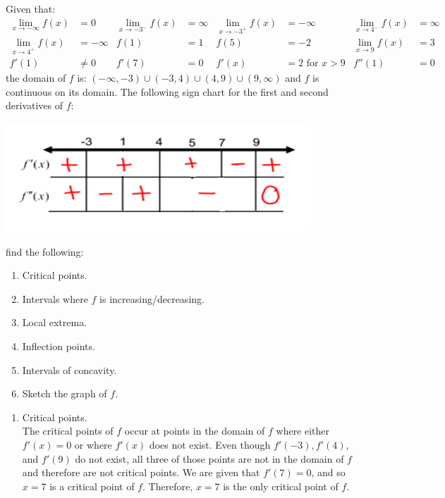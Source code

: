 \documentclass[nooutcomes,handout]{ximera}
\begin{document}
\begin{problem}
  Given that:
  \begin{align*}
    \lim_{x \to - \infty} f(x) &= 0 & \lim_{x \to -3^-} f(x) &= \infty  & \lim_{x \to -3^+} f(x) &= - \infty & \lim_{x \to 4^-} f(x) &= \infty\\
  \lim_{x \to 4^+} f(x) &= -\infty & f(1) &= 1 & f(5) &= -2 & \lim_{x \to 9} f(x) &= 3& \\
    f'(1) &\ne 0 & f'(7) &= 0 & f'(x) &= 2 \text{ for } x > 9 & f''(1) &= 0 &
 \end{align*}
     the domain of $f$ is: $(-\infty,-3) \cup (-3,4) \cup (4,9)\cup (9,\infty)$ and $f$ is continuous on its domain.
The following sign chart for the first and second derivatives of $f$:
  \begin{image}
    \includegraphics[scale=.8]{Figure8.png}
  \end{image}
	
find the following:
  \begin{enumerate}
     \item  Critical points.
     \item  Intervals where $f$ is increasing/decreasing.
     \item  Local extrema.
     \item  Inflection points.
     \item  Intervals of concavity.
     \item  Sketch the graph of $f$.
	
  \end{enumerate}
  \begin{freeResponse}
    \begin{enumerate}
      \item
        Critical points. \\
	The critical points of $f$ occur at points in the domain of $f$ where either $f'(x)=0$ or where $f'(x)$ does not exist.  Even though $f'(-3), f'(4),$ and $f'(9)$ do not exist, all three of those points are not in the domain of $f$ and therefore are not critical points.  
        We are given that $f'(7)=0$, and so $x=7$ is a critical point of $f$.
                Therefore, $x=7$ is the only critical point of $f$.  
			

\end{enumerate}
\end{freeResponse}
\end{problem}
\end{document}
